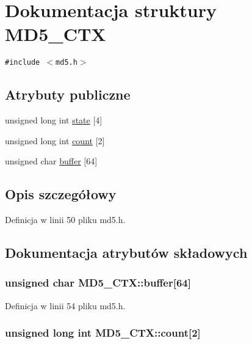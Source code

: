 \hypertarget{a00003}{
\section{Dokumentacja struktury MD5\_\-CTX}
\label{a00003}
}
{\tt \#include $<$md5.h$>$}

\subsection*{Atrybuty publiczne}
\begin{CompactItemize}
\item 
unsigned long int \hyperlink{a00003_2f697997f51de65d08227fdf1d5c44b8}{state} \mbox{[}4\mbox{]}
\item 
unsigned long int \hyperlink{a00003_889cb6e121b82a1e7f4d92120fb8a523}{count} \mbox{[}2\mbox{]}
\item 
unsigned char \hyperlink{a00003_2da73ecf544745f58211e998719f367f}{buffer} \mbox{[}64\mbox{]}
\end{CompactItemize}


\subsection{Opis szczegółowy}


Definicja w linii 50 pliku md5.h.

\subsection{Dokumentacja atrybutów składowych}
\hypertarget{a00003_2da73ecf544745f58211e998719f367f}{
\subsubsection[{buffer}]{\setlength{\rightskip}{0pt plus 5cm}unsigned char {\bf MD5\_\-CTX::buffer}\mbox{[}64\mbox{]}}}
\label{a00003_2da73ecf544745f58211e998719f367f}




Definicja w linii 54 pliku md5.h.\hypertarget{a00003_889cb6e121b82a1e7f4d92120fb8a523}{
\subsubsection[{count}]{\setlength{\rightskip}{0pt plus 5cm}unsigned long int {\bf MD5\_\-CTX::count}\mbox{[}2\mbox{]}}}
\label{a00003_889cb6e121b82a1e7f4d92120fb8a523}




